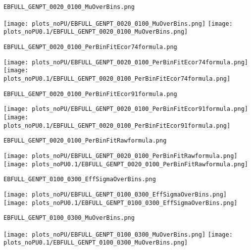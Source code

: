 \begin{frame}[fragile]
\begin{verbatim}
EBFULL_GENPT_0020_0100_MuOverBins.png
\end{verbatim}
\texttt{[image: plots\_noPU/EBFULL\_GENPT\_0020\_0100\_MuOverBins.png]}
\texttt{[image: plots\_noPU0.1/EBFULL\_GENPT\_0020\_0100\_MuOverBins.png]}
\end{frame}
\begin{frame}[fragile]
\begin{verbatim}
EBFULL_GENPT_0020_0100_PerBinFitEcor74formula.png
\end{verbatim}
\texttt{[image: plots\_noPU/EBFULL\_GENPT\_0020\_0100\_PerBinFitEcor74formula.png]}
\texttt{[image: plots\_noPU0.1/EBFULL\_GENPT\_0020\_0100\_PerBinFitEcor74formula.png]}
\end{frame}
\begin{frame}[fragile]
\begin{verbatim}
EBFULL_GENPT_0020_0100_PerBinFitEcor91formula.png
\end{verbatim}
\texttt{[image: plots\_noPU/EBFULL\_GENPT\_0020\_0100\_PerBinFitEcor91formula.png]}
\texttt{[image: plots\_noPU0.1/EBFULL\_GENPT\_0020\_0100\_PerBinFitEcor91formula.png]}
\end{frame}
\begin{frame}[fragile]
\begin{verbatim}
EBFULL_GENPT_0020_0100_PerBinFitRawformula.png
\end{verbatim}
\texttt{[image: plots\_noPU/EBFULL\_GENPT\_0020\_0100\_PerBinFitRawformula.png]}
\texttt{[image: plots\_noPU0.1/EBFULL\_GENPT\_0020\_0100\_PerBinFitRawformula.png]}
\end{frame}
\begin{frame}[fragile]
\begin{verbatim}
EBFULL_GENPT_0100_0300_EffSigmaOverBins.png
\end{verbatim}
\texttt{[image: plots\_noPU/EBFULL\_GENPT\_0100\_0300\_EffSigmaOverBins.png]}
\texttt{[image: plots\_noPU0.1/EBFULL\_GENPT\_0100\_0300\_EffSigmaOverBins.png]}
\end{frame}
\begin{frame}[fragile]
\begin{verbatim}
EBFULL_GENPT_0100_0300_MuOverBins.png
\end{verbatim}
\texttt{[image: plots\_noPU/EBFULL\_GENPT\_0100\_0300\_MuOverBins.png]}
\texttt{[image: plots\_noPU0.1/EBFULL\_GENPT\_0100\_0300\_MuOverBins.png]}
\end{frame}
